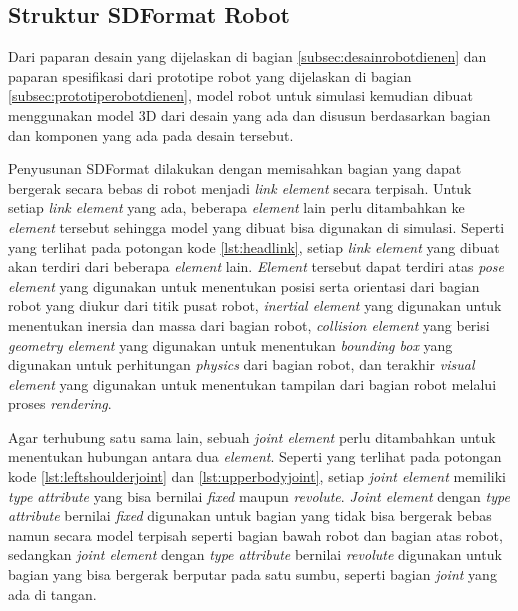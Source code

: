 \subsection{Struktur SDFormat Robot}
\label{subsec:sdformatrobot}

Dari paparan desain yang dijelaskan di bagian \ref{subsec:desainrobotdienen} dan paparan spesifikasi dari prototipe robot yang dijelaskan di bagian \ref{subsec:prototiperobotdienen},
  model robot untuk simulasi kemudian dibuat menggunakan model 3D dari desain yang ada dan disusun berdasarkan bagian dan komponen yang ada pada desain tersebut.

Penyusunan SDFormat dilakukan dengan memisahkan bagian yang dapat bergerak secara bebas di robot menjadi \emph{link element} secara terpisah.
Untuk setiap \emph{link element} yang ada,
  beberapa \emph{element} lain perlu ditambahkan ke \emph{element} tersebut sehingga model yang dibuat bisa digunakan di simulasi.
Seperti yang terlihat pada potongan kode \ref{lst:headlink},
  setiap \emph{link element} yang dibuat akan terdiri dari beberapa \emph{element} lain.
\emph{Element} tersebut dapat terdiri atas \emph{pose element} yang digunakan untuk menentukan posisi serta orientasi dari bagian robot yang diukur dari titik pusat robot,
  \emph{inertial element} yang digunakan untuk menentukan inersia dan massa dari bagian robot,
  \emph{collision element} yang berisi \emph{geometry element} yang digunakan untuk menentukan \emph{bounding box} yang digunakan untuk perhitungan \emph{physics} dari bagian robot,
  dan terakhir \emph{visual element} yang digunakan untuk menentukan tampilan dari bagian robot melalui proses \emph{rendering}.



Agar terhubung satu sama lain,
  sebuah \emph{joint element} perlu ditambahkan untuk menentukan hubungan antara dua \emph{element}.
Seperti yang terlihat pada potongan kode \ref{lst:leftshoulderjoint} dan \ref{lst:upperbodyjoint},
  setiap \emph{joint element} memiliki \emph{type attribute} yang bisa bernilai \emph{fixed} maupun \emph{revolute}.
\emph{Joint element} dengan \emph{type attribute} bernilai \emph{fixed} digunakan untuk bagian yang tidak bisa bergerak bebas namun secara model terpisah seperti bagian bawah robot dan bagian atas robot,
  sedangkan \emph{joint element} dengan \emph{type attribute} bernilai \emph{revolute} digunakan untuk bagian yang bisa bergerak berputar pada satu sumbu, seperti bagian \emph{joint} yang ada di tangan.

